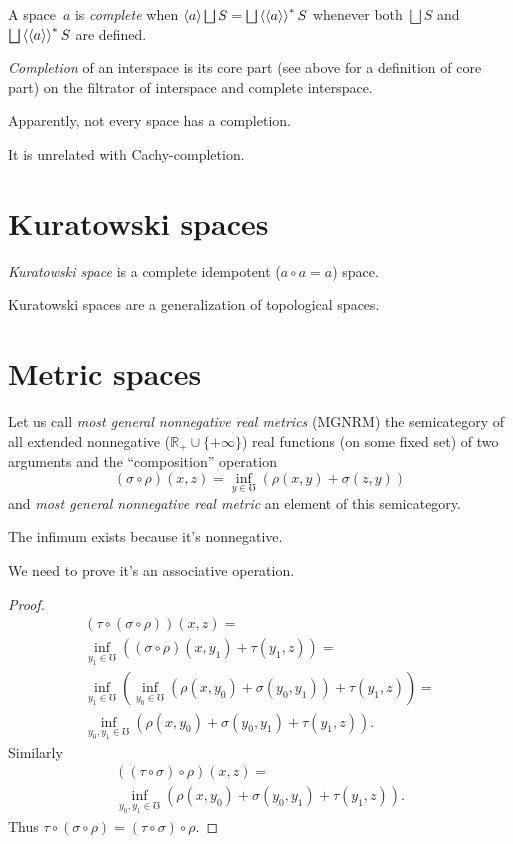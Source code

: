 A space~$a$ is \emph{complete} when $\supfun{a}\bigsqcup S=\bigsqcup\rsupfun{\supfun{a}}S$ whenever both $\bigsqcup S$ and $\bigsqcup\rsupfun{\supfun{a}}S$ are defined.

\begin{defn}
\emph{Completion} of an interspace is its core part (see above for a definition of core part) on the filtrator of interspace and complete interspace.
\end{defn}

\begin{note}
Apparently, not every space has a completion.
\end{note}

\begin{note}
It is unrelated with Cachy-completion.
\end{note}

\chapter{Kuratowski spaces}

\begin{defn}
\emph{Kuratowski space} is a complete idempotent ($a\circ a=a$) space.
\end{defn}

Kuratowski spaces are a generalization of topological spaces.

\chapter{Metric spaces}

Let us call \emph{most general nonnegative real metrics} (MGNRM) the semicategory of all extended nonnegative ($\mathbb{R}_{+}\cup\{+\infty\}$) real functions (on some fixed set) of two arguments and the ``composition'' operation
\[ (\sigma\circ\rho)(x,z) = \inf_{y\in\mho}(\rho(x,y)+\sigma(z,y)) \]
and \emph{most general nonnegative real metric} an element of this semicategory.

\begin{rem}
The infimum exists because it's nonnegative.
\end{rem}

We need to prove it's an associative operation.

\begin{proof}
\begin{multline*}
(\tau\circ(\sigma\circ\rho))(x,z) = \\
\inf_{y_1\in\mho}((\sigma\circ\rho)(x,y_1)+\tau(y_1,z)) = \\
\inf_{y_1\in\mho}(\inf_{y_0\in\mho}(\rho(x,y_0)+\sigma(y_0,y_1))+\tau(y_1,z)) = \\
\inf_{y_0,y_1\in\mho}(\rho(x,y_0)+\sigma(y_0,y_1)+\tau(y_1,z)).
\end{multline*}
Similarly 
\begin{multline*}
((\tau\circ\sigma)\circ\rho)(x,z) = \\
\inf_{y_0,y_1\in\mho}(\rho(x,y_0)+\sigma(y_0,y_1)+\tau(y_1,z)).
\end{multline*}
Thus $\tau\circ(\sigma\circ\rho)=(\tau\circ\sigma)\circ\rho$.
\end{proof}

